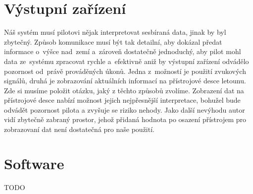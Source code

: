 	\section{Výstupní zařízení}
		Náš systém musí pilotovi nějak interpretovat sesbíraná data, jinak by byl zbytečný. Způsob komunikace musí být tak detailní, aby dokázal předat informace o~výšce nad~zemí a~zároveň dostatečně jednoduchý, aby pilot mohl data ze~systému zpracovat rychle a~efektivně aniž by výstupní zařízení odvádělo pozornost od~právě prováděných úkonů. Jedna z~možností je použití zvukových signálů, druhá je zobrazování aktuálních informací na přístrojové desce letounu. Zde si musíme položit otázku, jaký z těchto způsobů zvolíme. Zobrazení dat na přístrojové desce nabízí možnost jejich nejpřesnější interpretace, bohužel bude odvádět pozornost pilota a zvyšuje se riziko nehody. Jako další nevýhodu autor vidí zbytečně zabraný prostor, jehož přidaná hodnota po osazení přístrojem pro zobrazovaní dat není dostatečná pro naše použití. 
			
	\section{Software}\label{navrhReseni::software}
		
		TODO %
	

